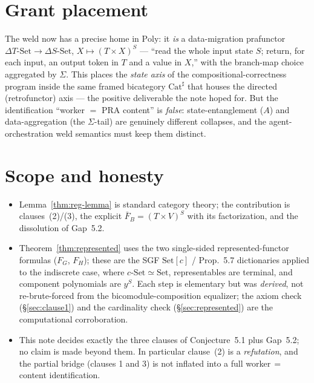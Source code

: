 \documentclass[11pt]{article}
\theoremstyle{definition}
\newcommand{\Set}{\mathrm{Set}}
\newcommand{\Poly}{\mathrm{Poly}}
\newcommand{\Cat}{\mathrm{Cat}^{\sharp}}
\begin{document}
\section{Grant placement}\label{sec:grant}

The weld now has a precise home in $\Poly$: it \emph{is} a data-migration prafunctor
$\Delta T\text{-}\Set\to\Delta S\text{-}\Set$, $X\mapsto(T\times X)^{S}$ --- ``read the whole
input state $S$; return, for each input, an output token in $T$ and a value in $X$,'' with
the branch-map choice aggregated by $\Sigma$. This places the \emph{state axis} of the
compositional-correctness program inside the same framed bicategory $\Cat$ that houses the
directed (retrofunctor) axis --- the positive deliverable the note hoped for. But the
identification ``worker $=$ PRA content'' is \emph{false}: state-entanglement ($A$) and
data-aggregation (the $\Sigma$-tail) are genuinely different collapses, and the
agent-orchestration weld semantics must keep them distinct.

\section{Scope and honesty}\label{sec:honesty}

\begin{itemize}
\item Lemma~\ref{thm:reg-lemma} is standard category theory; the contribution is
clauses~(2)/(3), the explicit $\bar F_{B}=(T\times V)^{S}$ with its factorization, and the
dissolution of Gap~5.2.
\item Theorem~\ref{thm:represented} uses the two single-sided represented-functor formulas
($F_{G}$, $F_{H}$); these are the SGF $\Set[c]$ / Prop.~5.7 dictionaries applied to the
indiscrete case, where $c\text{-}\Set\simeq\Set$, representables are terminal, and component
polynomials are $y^{S}$. Each step is elementary but was \emph{derived}, not re-brute-forced
from the bicomodule-composition equalizer; the axiom check (\S\ref{sec:clause1}) and the
cardinality check (\S\ref{sec:represented}) are the computational corroboration.
\item This note decides exactly the three clauses of Conjecture~5.1 plus Gap~5.2; no claim
is made beyond them. In particular clause~(2) is a \emph{refutation}, and the
partial bridge (clauses 1 and 3) is not inflated into a full worker$\,=\,$content
identification.
\end{itemize}
\end{document}
